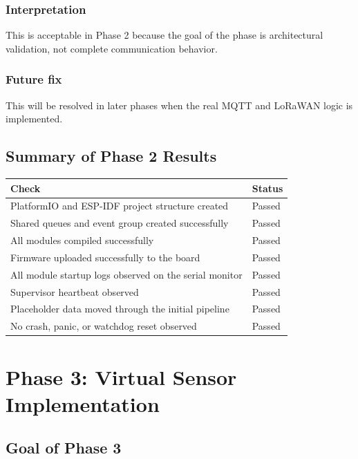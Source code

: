 \documentclass[12pt,a4paper]{article}
\begin{document}
\subsubsection*{Interpretation}

This is acceptable in Phase 2 because the goal of the phase is architectural
validation, not complete communication behavior.

\subsubsection*{Future fix}

This will be resolved in later phases when the real MQTT and LoRaWAN logic is
implemented.

\subsection{Summary of Phase 2 Results}

\begin{longtable}{|>{\raggedright\arraybackslash}p{}|>{\raggedright\arraybackslash}p{}|}
\hline
\textbf{Check} & \textbf{Status} \\
\hline
PlatformIO and ESP-IDF project structure created & Passed \\
\hline
Shared queues and event group created successfully & Passed \\
\hline
All modules compiled successfully & Passed \\
\hline
Firmware uploaded successfully to the board & Passed \\
\hline
All module startup logs observed on the serial monitor & Passed \\
\hline
Supervisor heartbeat observed & Passed \\
\hline
Placeholder data moved through the initial pipeline & Passed \\
\hline
No crash, panic, or watchdog reset observed & Passed \\
\hline
\end{longtable}

\section{Phase 3: Virtual Sensor Implementation}

\subsection{Goal of Phase 3}
\end{document}
